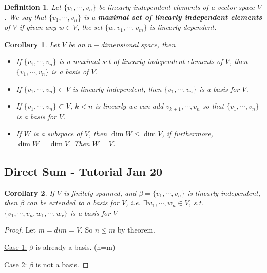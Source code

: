 \documentclass[12pt]{article}
\theoremstyle{plain}
\newtheorem{definition}{Definition}[subsection]
\newtheorem{corollary}{Corollary}[subsection]
\begin{document}
	\begin{definition}
		Let $\{v_1, \cdots, v_n\}$ be linearly independent elements of a vector
		space $V$. We say that $\{v_1, \cdots, v_n\}$ is a \textbf{maximal set
		of linearly independent elements} of $V$ if given any $w \in V$, 
		the set $\{w, v_1, \cdots, v_m\}$ is linearly dependent.\\
	\end{definition}

	\begin{corollary}
		Let $V$ be an $n-$dimensional space, then 
		\begin{itemize}
			\item If $\{v_1, \cdots, v_n\}$ is a maximal set of linearly 
				independent elements of $V$, then $\{v_1, \cdots, v_n\}$ is a 
				basis of $V$. 
			\item 
				If $\{v_1, \cdots, v_n\} \subset V$ is linearly independent, 
				then $\{v_1, \cdots, v_n\}$ is a basis for $V$.
			
			\item
				If $\{v_1, \cdots, v_n\} \subset V$, $k<n$ is linearly
				we can add $v_{k+1}, \cdots, v_n$ so that $\{v_1, \cdots,
				v_n\}$ is a basis for $V$. 
			
			\item 
				If $W$ is a subspace of $V$, then $\dim W\leq \dim V$, 
				if furthermore, $\dim W = \dim V$. Then $W = V$.
		\end{itemize}
	\end{corollary}



	\newpage

	\subsection{Direct Sum - Tutorial Jan 20}
	

	\begin{corollary}
		If $V$ is finitely spanned, and $\beta=\{v_1,\cdots,v_n\}$
		is linearly independent, then $\beta$ can be extended to a basis for 
		$V$, i.e. $\exists w_1, \cdots, w_n \in V$, s.t. 
		$\{v_1,\cdots, v_n, w_1, \cdots, w_r\}$ is a basis for $V$
	\end{corollary}
	\begin{proof}
		Let $m = dim = V$. So $n\leq m$ by theorem.

		\underline{Case 1:} $\beta$ is already a basis. (n=m)

		\underline{Case 2:} $\beta$ is not a basis. 
	\end{proof}
\end{document}
